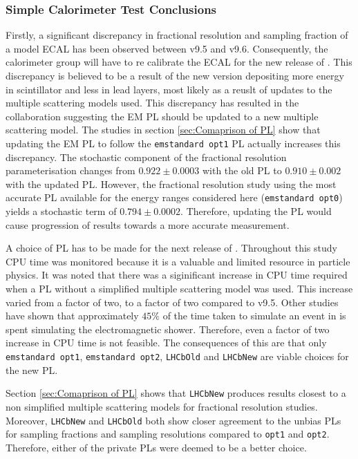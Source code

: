 \subsubsection{Simple Calorimeter Test Conclusions}
\label{ref:CaloConclusions}
Firstly, a significant discrepancy in fractional resolution and sampling fraction of a model \lhcb ECAL has been observed between \geant v9.5 and v9.6.  Consequently, the \lhcb calorimeter group will have to re calibrate the ECAL for the new release of \gauss. This discrepancy is believed to be a result of the new \geant version depositing more energy in scintillator and less in lead layers, most likely as a reuslt of updates to the multiple scattering models used.  This discrepancy has resulted in the \geant collaboration suggesting the \lhcb EM PL should be updated to a new multiple scattering model.  The studies in section \ref{sec:Comaprison of PL} show that updating the \lhcb EM PL to follow the \texttt{emstandard opt1} PL actually increases this discrepancy. The stochastic component of the fractional resolution parameterisation changes from $0.922 \pm 0.0003$ with the old \lhcb PL to $0.910\pm 0.002$ with the updated \lhcb PL. However, the fractional resolution study using the most accurate PL available for the energy ranges considered here (\texttt{emstandard opt0}) yields a stochastic term of $0.794\pm0.0002$.  Therefore, updating the \lhcb PL would cause progression of results towards a more accurate measurement.

A choice of PL has to be made for the next release of \gauss.  Throughout this study CPU time was monitored because it is a valuable and limited resource in particle physics.  It was noted that there was a siginificant increase in CPU time required when a PL without a simplified multiple scattering model was used. This increase varied from a factor of two, to a factor of two compared to v9.5.  Other studies have shown that approximately $45\%$ of the time taken to simulate an event in \gauss is spent simulating the electromagnetic shower.  Therefore, even a factor of two increase in CPU time is not feasible.  The consequences of this are that only \texttt{emstandard opt1}, \texttt{emstandard opt2}, \texttt{LHCbOld} and \texttt{LHCbNew} are viable choices for the new PL.

Section \ref{sec:Comaprison of PL} shows that \texttt{LHCbNew} produces results closest to a non simplified multiple scattering models for fractional resolution studies.  Moreover, \texttt{LHCbNew} and \texttt{LHCbOld} both show closer agreement to the unbias PLs for sampling fractions and sampling resolutions compared to \texttt{opt1} and \texttt{opt2}.  Therefore, either of the \lhcb private PLs were deemed to be a better choice. 

